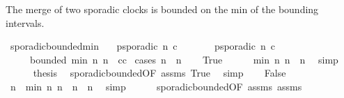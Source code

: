 \begin{isabellebody}
%
\endisadelimproof
%
\isadelimdocument
%
\endisadelimdocument
%
\isatagdocument
%
\isamarkuptrue%
%
\endisatagdocument
{\isafolddocument}%
%
\isadelimdocument
%
\endisadelimdocument
%
\begin{isamarkuptext}%
The merge of two sporadic clocks is bounded on the min of the bounding intervals.%
\end{isamarkuptext}\isamarkuptrue%
\isamarkupfalse%
\ sporadic{\isacharunderscore}bounded{\isacharunderscore}min{\isacharcolon}\isanewline
\ \ \ {\isacartoucheopen}p{\isacharunderscore}sporadic\ n\ c{\isacartoucheclose}\isanewline
\ \ \ \ \ \ \ {\isacartoucheopen}p{\isacharunderscore}sporadic\ n{\isacharprime}\ c{\isacharprime}{\isacartoucheclose}\isanewline
\ \ \ \ \ {\isacartoucheopen}bounded\ {\isacharparenleft}{\isacharparenleft}min\ n\ n{\isacharprime}{\isacharparenright}{\isacharplus}{}{\isacharparenright}\ {}\ {\isacharparenleft}c{\isasymoplus}c{\isacharprime}{\isacharparenright}{\isacartoucheclose}\isanewline
%
\isadelimproof
%
\endisadelimproof
%
\isatagproof
{}\isamarkupfalse%
\ {\isacharparenleft}cases\ {\isacartoucheopen}n\ {\isasymle}\ n{\isacharprime}{\isacartoucheclose}{\isacharparenright}\isanewline
\ \ \isamarkupfalse%
\ True\isanewline
\ \ \ \ \isamarkupfalse%
\ {\isacartoucheopen}min\ n\ n{\isacharprime}\ {\isacharequal}\ n{\isacartoucheclose}\ \isamarkupfalse%
\ simp\isanewline
\ \ \ \ \isamarkupfalse%
\ {\isacharquery}thesis\ \isamarkupfalse%
\ sporadic{\isacharunderscore}bounded{}{\isacharbrackleft}OF\ assms\ True{\isacharbrackright}\ \isamarkupfalse%
\ simp\isanewline
{}\isamarkupfalse%
\isanewline
\ \ \isamarkupfalse%
\ False\isanewline
\ \ \ \ \isamarkupfalse%
\ {}{\isacharcolon}{\isacartoucheopen}n{\isacharprime}\ {\isacharequal}\ min\ n\ n{\isacharprime}{\isacartoucheclose}\ \ {}{\isacharcolon}{\isacartoucheopen}n{\isacharprime}\ {\isasymle}\ n{\isacartoucheclose}\ \isamarkupfalse%
\ simp{\isacharplus}\isanewline
\ \ \ \ \isamarkupfalse%
\ sporadic{\isacharunderscore}bounded{}{\isacharbrackleft}OF\ assms{\isacharparenleft}{}{\isacharparenright}\ assms{\isacharparenleft}{}{\isacharparenright}\ {}{\isacharbrackright}\ {}\ \isamarkupfalse%

\end{isabellebody}
